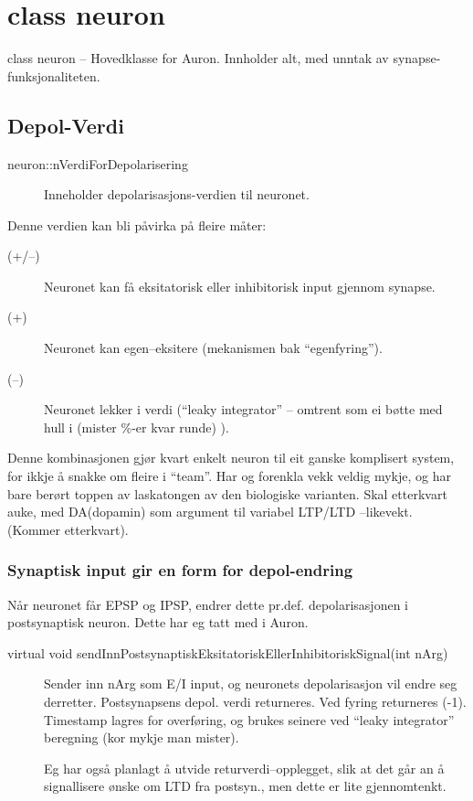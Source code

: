 
\chapter{class neuron}

class neuron -- Hovedklasse for Auron. Innholder alt, med unntak av synapse-funksjonaliteten.

\section{Depol-Verdi}
\label{depolVerdi}
\begin{description}\item[neuron::nVerdiForDepolarisering] Inneholder depolarisasjons-verdien til neuronet.\end{description}
Denne verdien kan bli påvirka på fleire måter:
\begin{description}
	\item[(+/--)] Neuronet kan få eksitatorisk eller inhibitorisk input gjennom synapse.
	\item[ (+) ] Neuronet kan egen--eksitere (mekanismen bak ``egenfyring'').
	\item[ (--) ] Neuronet lekker i verdi (``leaky integrator'' -- omtrent som ei bøtte med hull i (mister \%-er kvar runde) ).
\end{description}
Denne kombinasjonen gjør kvart enkelt neuron til eit ganske komplisert system, for ikkje å snakke om fleire i ``team''. Har og forenkla vekk veldig mykje, og har bare berørt toppen av laskatongen av den biologiske varianten. Skal etterkvart auke, med DA(dopamin) som argument til variabel LTP/LTD --likevekt. (Kommer etterkvart).

\subsection{Synaptisk input gir en form for depol-endring}
Når neuronet får EPSP og IPSP, endrer dette pr.def. depolarisasjonen i postsynaptisk neuron. Dette har eg tatt med i Auron.
\begin{description}\item[virtual void sendInnPostsynaptiskEksitatoriskEllerInhibitoriskSignal(int nArg)] 
	Sender inn nArg som E/I input, og neuronets depolarisasjon vil endre seg derretter. Postsynapsens depol. verdi returneres. Ved fyring returneres (-1).
	Timestamp lagres for overføring, og brukes seinere ved ``leaky integrator'' beregning (kor mykje man mister).
	
	Eg har også planlagt å utvide returverdi--opplegget, slik at det går an å signallisere ønske om LTD fra postsyn., men dette er lite gjennomtenkt.
\end{description}

